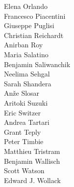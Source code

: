 \documentclass[PICOReport.tex]{subfiles}
\begin{document}
{\begin{multicols}{4}
Elena Orlando                   \\
Francesco Piacentini            \\
Giuseppe Puglisi                \\
Christian Reichardt             \\
Anirban Roy                     \\
Maria Salatino                  \\
Benjamin Saliwanchik            \\
Neelima Sehgal                  \\
Sarah Shandera                  \\
An\v{z}e Slosar                 \\
Aritoki Suzuki                  \\
Eric Switzer                    \\
Andrea Tartari                  \\
Grant Teply                     \\
Peter Timbie                    \\
Matthieu Tristram               \\
Benjamin Wallisch               \\
Scott Watson                    \\
Edward J. Wollack               
\end{multicols}

}
\end{document}
